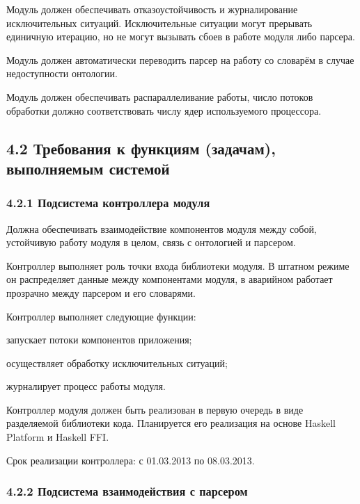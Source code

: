 Модуль должен обеспечивать отказоустойчивость и журналирование исключительных ситуаций. Исключительные ситуации могут прерывать единичную итерацию, но не могут вызывать сбоев в работе модуля либо парсера.

Модуль должен автоматически переводить парсер на работу со словарём в случае недоступности онтологии.

Модуль должен обеспечивать распараллеливание работы, число потоков обработки должно соответствовать числу ядер используемого процессора.

\subsection*{4.2 Требования к функциям (задачам), выполняемым системой}

\subsubsection*{4.2.1 Подсистема контроллера модуля}

Должна обеспечивать взаимодействие компонентов модуля между собой, устойчивую
работу модуля в целом, связь с онтологией и парсером.

Контроллер выполняет роль точки входа библиотеки модуля. В штатном режиме он распределяет данные между компонентами модуля, в аварийном работает прозрачно между парсером и его словарями.

Контроллер выполняет следующие функции:
\begin{list}{}{\leftmargin=1.5cm}
  \item запускает потоки компонентов приложения;
  \item осуществляет обработку исключительных ситуаций;
  \item журналирует процесс работы модуля.
\end{list}

Контроллер модуля должен быть реализован в первую очередь в виде разделяемой библиотеки кода. Планируется его реализация на основе Haskell Platform и Haskell FFI.

Срок реализации контроллера: с 01.03.2013 по 08.03.2013.

\subsubsection*{4.2.2 Подсистема взаимодействия с парсером}

